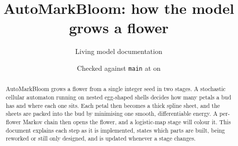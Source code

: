 \documentclass[11pt,a4paper]{article}
\title{AutoMarkBloom: how the model grows a flower}
\author{Living model documentation}
\date{Checked against \texttt{main} at \texttt{\docsyncedcommit} on \docsynced}
\begin{document}
\maketitle

\begin{abstract}
AutoMarkBloom grows a flower from a single integer seed in two stages.
A stochastic cellular automaton running on nested egg-shaped shells decides how
many petals a bud has and where each one sits. Each petal then becomes a thick
spline sheet, and the sheets are packed into the bud by minimising one smooth,
differentiable energy. A per-flower Markov chain then opens the flower, and
a logistic-map stage will colour it. This document explains each step as it is
implemented, states which parts are built, being reworked or still only
designed, and is updated whenever a stage changes.
\end{abstract}

\tableofcontents














\appendix

\end{document}
